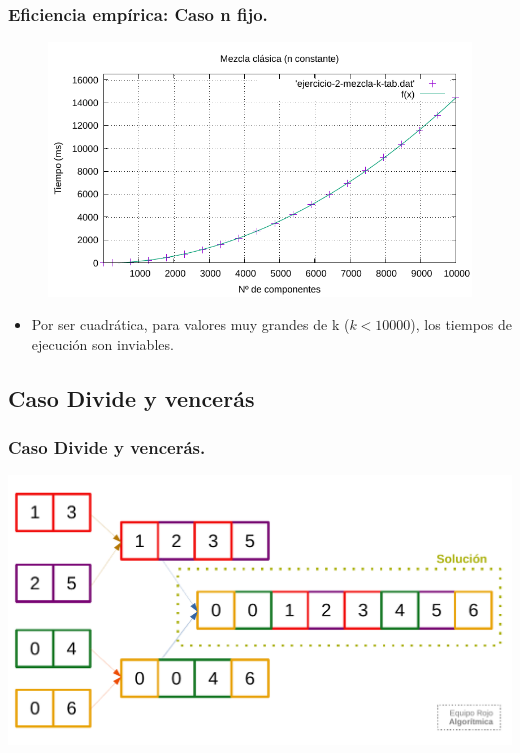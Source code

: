 \documentclass[13pt]{beamer}
\begin{document}
    \begin{frame}
        \frametitle{Eficiencia empírica: Caso n fijo.}

        \begin{figure}
            \centering
            \includegraphics[scale=0.76]{img/e2-obvio-k.pdf}
            \label{fig:2a-obvio-k-graph}
        \end{figure}

        \begin{itemize}
            \item Por ser cuadrática, para valores muy grandes de k ($k < 10000$), los tiempos de ejecución
            son inviables. 
        \end{itemize}
    \end{frame}

    \subsection{Caso Divide y vencerás}


    \begin{frame}
        \frametitle{Caso Divide y vencerás.}

        \includegraphics[scale=0.66]{img/orden_2b.pdf}
    \end{frame}
\end{document}
